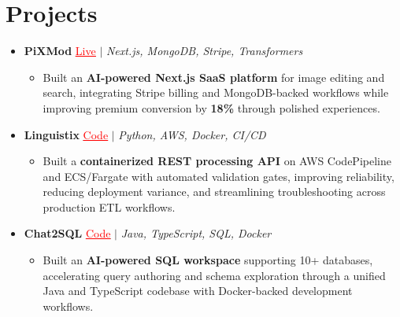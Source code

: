 \documentclass[letterpaper,10pt]{article}
\newcommand{\resumeItem}[1]{\item\small{{#1 \vspace{-2pt}}}}
\newcommand{\resumeProjectHeading}[1]{\item \small #1 \vspace{-2pt}}
\newcommand{\resumeSubHeadingListStart}{\begin{itemize}[leftmargin=0.0in, label={}]}
\newcommand{\resumeSubHeadingListEnd}{\end{itemize}}
\newcommand{\resumeProjItemListStart}{\begin{itemize}[leftmargin=0.15in,label=\textbullet,itemsep=0pt,topsep=0pt,parsep=0pt,partopsep=0pt]}
\newcommand{\resumeProjItemListEnd}{\end{itemize}\vspace{-4pt}}
\begin{document}
\section{Projects}
\resumeSubHeadingListStart
\vspace{-2pt}
\resumeProjectHeading{\textbf{PiXMod} {\href{https://pixmod.vercel.app/}{\textcolor{red}{\underline{Live}}}} $|$ \emph{Next.js, MongoDB, Stripe, Transformers}}
\resumeProjItemListStart
\resumeItem{Built an \textbf{AI-powered Next.js SaaS platform} for image editing and search, integrating Stripe billing and MongoDB-backed workflows while improving premium conversion by \textbf{18\%} through polished experiences.}
\resumeProjItemListEnd
\vspace{3pt}
\resumeProjectHeading{\textbf{Linguistix} {\href{https://github.com/SAHAJ-BHADJA/Linguistix}{\textcolor{red}{\underline{Code}}}} $|$ \emph{Python, AWS, Docker, CI/CD}}
\resumeProjItemListStart
\resumeItem{Built a \textbf{containerized REST processing API} on AWS CodePipeline and ECS/Fargate with automated validation gates, improving reliability, reducing deployment variance, and streamlining troubleshooting across production ETL workflows.}
\resumeProjItemListEnd
\vspace{3pt}
\resumeProjectHeading{\textbf{Chat2SQL} {\href{https://github.com/SAHAJ-BHADJA/Chat2SQL}{\textcolor{red}{\underline{Code}}}} $|$ \emph{Java, TypeScript, SQL, Docker}}
\resumeProjItemListStart
\resumeItem{Built an \textbf{AI-powered SQL workspace} supporting 10+ databases, accelerating query authoring and schema exploration through a unified Java and TypeScript codebase with Docker-backed development workflows.}
\resumeProjItemListEnd
\resumeSubHeadingListEnd
\end{document}
